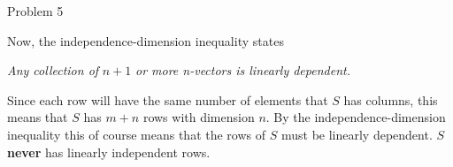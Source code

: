 \begin{problem}{Problem 5}
\begin{Highlight}
\begin{enumerate}[label = (\alph*), start = 2]
            Now, the independence-dimension inequality states
    
            \begin{center}
                \textit{Any collection of} $n + 1$ \textit{or more n-vectors is linearly dependent.}
            \end{center}
            Since each row will have the same number of elements that $S$ has columns, this means that $S$ has $m + n$ rows with dimension $n$. By the independence-dimension inequality this of course means that
            the rows of $S$ must be linearly dependent. $S$ \textbf{never} has linearly independent rows.
        \end{enumerate}
    \end{Highlight}
\end{problem}

